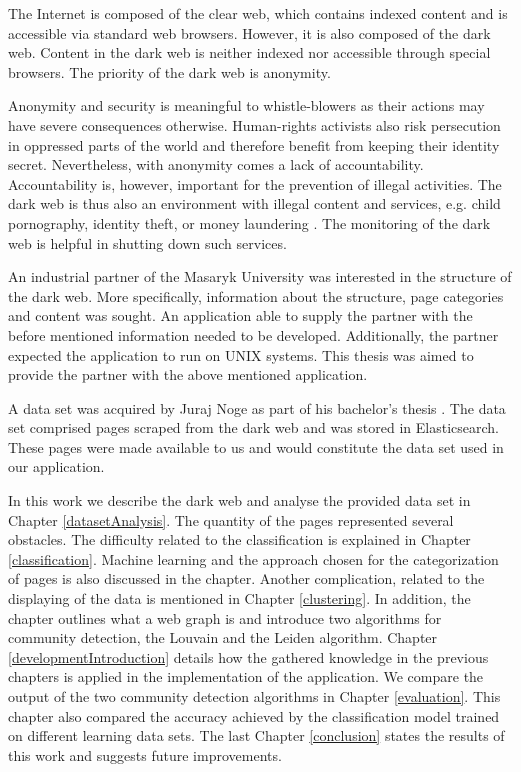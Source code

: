 \label{introduction}
The Internet is composed of the clear web, which contains indexed content and is accessible via standard web browsers. However, it is also composed of the dark web. Content in the dark web is neither indexed nor accessible through special browsers. The priority of the dark web is anonymity.

Anonymity and security is meaningful to whistle-blowers as their actions may have severe consequences otherwise. Human-rights activists also risk persecution in oppressed parts of the world and therefore benefit from keeping their identity secret. Nevertheless, with anonymity comes a lack of accountability. Accountability is, however, important for the prevention of illegal activities. The dark web is thus also an environment with illegal content and services, e.g. child pornography, identity theft, or money laundering \cite{theDarkNet}. The monitoring of the dark web is helpful in shutting down such services.

An industrial partner of the Masaryk University was interested in the structure of the dark web. More specifically, information about the structure, page categories and content was sought. An application able to supply the partner with the before mentioned information needed to be developed. Additionally, the partner expected the application to run on UNIX systems. This thesis was aimed to provide the partner with the above mentioned application. 

A data set was acquired by Juraj Noge as part of his bachelor's thesis \cite{bcScraping}. The data set comprised pages scraped from the dark web and was stored in Elasticsearch. These pages were made available to us and would constitute the data set used in our application.

In this work we describe the dark web and analyse the provided data set in Chapter \ref{datasetAnalysis}. The quantity of the pages represented several obstacles. The difficulty related to the classification is explained in Chapter \ref{classification}. Machine learning and the approach chosen for the categorization of pages is also discussed in the chapter. Another complication, related to the displaying of the data is mentioned in Chapter \ref{clustering}. In addition, the chapter outlines what a web graph is and introduce two algorithms for community detection, the Louvain and the Leiden algorithm. Chapter \ref{developmentIntroduction} details how the gathered knowledge in the previous chapters is applied in the implementation of the application. We compare the output of the two community detection algorithms in Chapter \ref{evaluation}. This chapter also compared the accuracy achieved by the classification model trained on different learning data sets. The last Chapter \ref{conclusion} states the results of this work and suggests future improvements.

